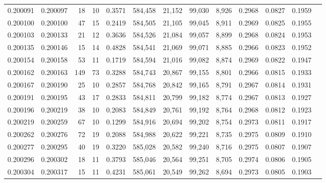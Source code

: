 \begin{tabular}{rrrrrrrrrrrrr}
0.200091 & 0.200097 &    18 &  10 &                                     0.3571 & 584,458 &  21,152 &  99,030 &   8,926 & 0.2968 & 0.0827 & 0.1959 \\
0.200100 & 0.200100 &    47 &  15 &                                     0.2419 & 584,505 &  21,105 &  99,045 &   8,911 & 0.2969 & 0.0825 & 0.1955 \\
0.200103 & 0.200133 &    21 &  12 &                                     0.3636 & 584,526 &  21,084 &  99,057 &   8,899 & 0.2968 & 0.0824 & 0.1953 \\
0.200135 & 0.200146 &    15 &  14 &                                     0.4828 & 584,541 &  21,069 &  99,071 &   8,885 & 0.2966 & 0.0823 & 0.1952 \\
0.200154 & 0.200158 &    53 &  11 &                                     0.1719 & 584,594 &  21,016 &  99,082 &   8,874 & 0.2969 & 0.0822 & 0.1947 \\
0.200162 & 0.200163 &   149 &  73 &                                     0.3288 & 584,743 &  20,867 &  99,155 &   8,801 & 0.2966 & 0.0815 & 0.1933 \\
0.200167 & 0.200190 &    25 &  10 &                                     0.2857 & 584,768 &  20,842 &  99,165 &   8,791 & 0.2967 & 0.0814 & 0.1931 \\
0.200191 & 0.200195 &    43 &  17 &                                     0.2833 & 584,811 &  20,799 &  99,182 &   8,774 & 0.2967 & 0.0813 & 0.1927 \\
0.200196 & 0.200219 &    38 &  10 &                                     0.2083 & 584,849 &  20,761 &  99,192 &   8,764 & 0.2968 & 0.0812 & 0.1923 \\
0.200219 & 0.200259 &    67 &  10 &                                     0.1299 & 584,916 &  20,694 &  99,202 &   8,754 & 0.2973 & 0.0811 & 0.1917 \\
0.200262 & 0.200276 &    72 &  19 &                                     0.2088 & 584,988 &  20,622 &  99,221 &   8,735 & 0.2975 & 0.0809 & 0.1910 \\
0.200277 & 0.200295 &    40 &  19 &                                     0.3220 & 585,028 &  20,582 &  99,240 &   8,716 & 0.2975 & 0.0807 & 0.1907 \\
0.200296 & 0.200302 &    18 &  11 &                                     0.3793 & 585,046 &  20,564 &  99,251 &   8,705 & 0.2974 & 0.0806 & 0.1905 \\
0.200304 & 0.200317 &    15 &  11 &                                     0.4231 & 585,061 &  20,549 &  99,262 &   8,694 & 0.2973 & 0.0805 & 0.1903 \\

\end{tabular}
